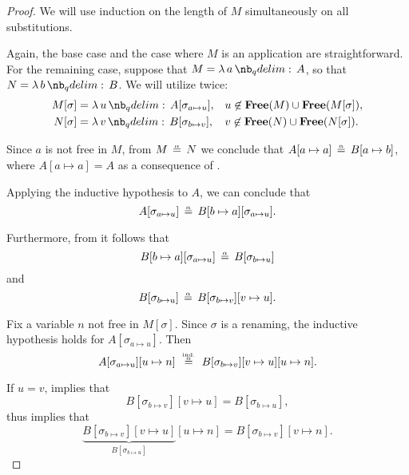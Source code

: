 \begin{proof}
  We will use induction on the length of \( M \) simultaneously on all substitutions.

  Again, the base case and the case where \( M \) is an application are straightforward. For the remaining case, suppose that \( M = \qabs a A \), so that \( N = \qabs b B \). We will utilize  twice:
  \begin{align*}
    M[\sigma] &= \qabs u A[\sigma_{a \mapsto u}], &&u \not\in \op*{Free}(M) \cup \op*{Free}(M[\sigma]), \\
    N[\sigma] &= \qabs v B[\sigma_{b \mapsto v}], &&v \not\in \op*{Free}(N) \cup \op*{Free}(N[\sigma]).
  \end{align*}

  Since \( a \) is not free in \( M \), from \( M \aequiv N \) we conclude that \( A[a \mapsto a] \aequiv B[a \mapsto b] \), where \( A[a \mapsto a] = A \) as a consequence of .

  Applying the inductive hypothesis to \( A \), we can conclude that
  \begin{equation*}
    A[\sigma_{a \mapsto u}] \aequiv B[b \mapsto a][\sigma_{a \mapsto u}].
  \end{equation*}

  Furthermore, from  it follows that
  \begin{equation*}
    B[b \mapsto a][\sigma_{a \mapsto u}] \aequiv B[\sigma_{b \mapsto u}]
  \end{equation*}
  and
  \begin{equation*}
    B[\sigma_{b \mapsto u}] \aequiv B[\sigma_{b \mapsto v}][v \mapsto u].
  \end{equation*}

  Fix a variable \( n \) not free in \( M[\sigma] \). Since \( \sigma \) is a renaming, the inductive hypothesis holds for \( A[\sigma_{a \mapsto u}] \). Then
  \begin{equation*}
    A[\sigma_{a \mapsto u}][u \mapsto n]
    \reloset {\T{ind.}} \aequiv
    B[\sigma_{b \mapsto v}][v \mapsto u][u \mapsto n].
  \end{equation*}

  If \( u = v \),  implies that
  \begin{equation*}
    B[\sigma_{b \mapsto v}][v \mapsto u] = B[\sigma_{b \mapsto u}],
  \end{equation*}
  thus  implies that
  \begin{equation*}
    \underbrace{B[\sigma_{b \mapsto v}][v \mapsto u]}_{B[\sigma_{b \mapsto u}]}[u \mapsto n] = B[\sigma_{b \mapsto v}][v \mapsto n].
  \end{equation*}


\end{proof}
